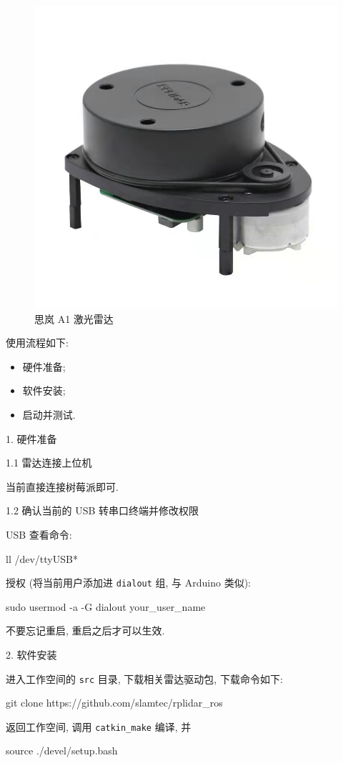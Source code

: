\documentclass[openany, fontset=windowsold]{ctexbook}
\theoremstyle{kaiti}
\theoremstyle{normal}
\begin{document}
\begin{figure}[!ht]
  \centering
  \includegraphics[width=.4\textwidth]{lidar_A1.jpg}
  \caption{思岚 A1 激光雷达}
  \label{fig:lidar_A1}
\end{figure}

使用流程如下:

\begin{itemize}
  \item 硬件准备; 
  \item 软件安装; 
  \item 启动并测试.
\end{itemize}

1. 硬件准备

1.1 雷达连接上位机

当前直接连接树莓派即可.

1.2 确认当前的 USB 转串口终端并修改权限

USB 查看命令:

\begin{bash}
  ll /dev/ttyUSB*
\end{bash}

授权 (将当前用户添加进 \verb|dialout| 组, 与 Arduino 类似):

\begin{bash}
  sudo usermod -a -G dialout your_user_name
\end{bash}

不要忘记重启, 重启之后才可以生效.

2. 软件安装

进入工作空间的 \verb|src| 目录, 下载相关雷达驱动包, 下载命令如下:

\begin{bash}
  git clone https://github.com/slamtec/rplidar_ros
\end{bash}

返回工作空间, 调用 \verb|catkin_make| 编译, 并

\begin{bash}
  source ./devel/setup.bash
\end{bash}
\end{document}
